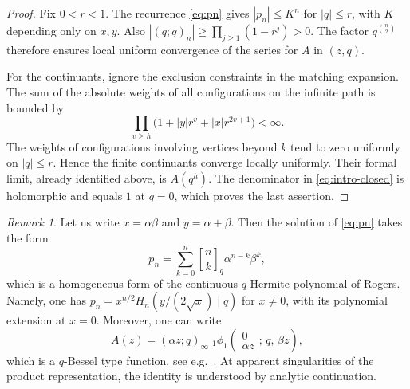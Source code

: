 \documentclass[11pt,reqno]{amsart}
\numberwithin{equation}{section}
\theoremstyle{remark}
\newtheorem{remark}[theorem]{Remark}
\newcommand{\qb}[2]{\genfrac{[}{]}{0pt}{}{#1}{#2}_{q}}
\begin{document}
\begin{proof}
Fix $0<r<1$. The recurrence \eqref{eq:pn} gives $|p_n|\le K^n$ for $|q|\le r$,
with $K$ depending only on $x,y$. Also
$|(q;q)_n|\ge\prod_{j\ge1}(1-r^j)>0$. The factor $q^{\binom n2}$ therefore ensures
local uniform convergence of the series for $A$ in $(z,q)$.

For the continuants, ignore the exclusion constraints in the matching expansion.
The sum of the absolute weights of all configurations on the infinite path is bounded by
\[
\prod_{v\ge h}\bigl(1+|y|r^v+|x|r^{2v+1}\bigr)<\infty.
\]
The weights of configurations involving vertices beyond $k$ tend to zero uniformly on
$|q|\le r$. Hence the finite continuants converge locally uniformly. Their formal limit,
already identified above, is $A(q^h)$. The denominator in \eqref{eq:intro-closed}
is holomorphic and equals $1$ at $q=0$, which proves the last assertion.
\end{proof}

\begin{remark}\label{rem:hermite}
Let us write $x=\alpha\beta$ and $y=\alpha+\beta$. Then the solution of \eqref{eq:pn}
takes the form
\[
p_n=\sum_{k=0}^n\qb nk\alpha^{n-k}\beta^k,
\]
which is a homogeneous form of the continuous $q$-Hermite polynomial of Rogers. Namely,
one has
$p_n=x^{n/2}H_n(y/(2\sqrt{x})\mid q)$ for $x\ne0$, with its polynomial extension at
$x=0$. Moreover, one can write
\[
A(z)=(\alpha z;q)_\infty\;{}_1\phi_1\!\left(\begin{matrix}0\\ \alpha z\end{matrix};\,q,\,\beta z\right),
\]
which is a $q$-Bessel type function, see e.g.\ \cite{GR04}. At apparent singularities
of the product representation, the identity is understood by analytic continuation.
\end{remark}
\end{document}
